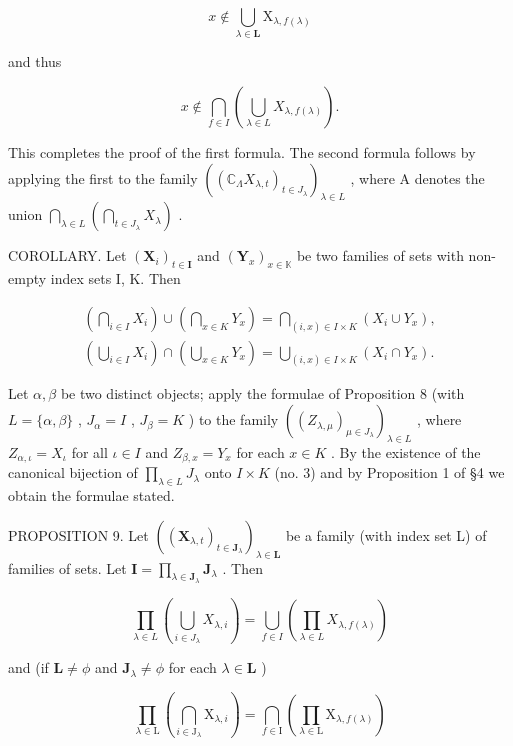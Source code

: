 \[
x \notin \bigcup_ {\lambda \in \mathbf {L}} \mathrm{X} _ {\lambda , f (\lambda)}
\]

and thus

\[
x \notin \bigcap_ {f \in I} \left(\bigcup_ {\lambda \in L} X _ {\lambda , f (\lambda)}\right).
\]

This completes the proof of the first formula. The second formula follows by applying the first to the family \(\left((\mathbb{C}_{\Lambda}X_{\lambda,t})_{t\in J_{\lambda}}\right)_{\lambda \in L}\) , where A denotes the union \(\bigcap_{\lambda \in L}\left(\bigcap_{t\in J_{\lambda}}X_{\lambda}\right)\) .

COROLLARY. Let \((\mathbf{X}_i)_{t\in \mathbf{I}}\) and \((\mathbf{Y}_x)_{x\in \mathbb{K}}\) be two families of sets with non-empty index sets I, K. Then

\[
\begin{array}{l} \left(\bigcap_ {i \in I} X _ {i}\right) \cup \left(\bigcap_ {x \in K} Y _ {x}\right) = \bigcap_ {(i, x) \in I \times K} (X _ {i} \cup Y _ {x}), \\ \left(\bigcup_ {i \in I} X _ {i}\right) \cap \left(\bigcup_ {x \in K} Y _ {x}\right) = \bigcup_ {(i, x) \in I \times K} (X _ {i} \cap Y _ {x}). \end{array}
\]

Let \(\alpha, \beta\) be two distinct objects; apply the formulae of Proposition 8 (with \(L = \{\alpha, \beta\}\) , \(J_{\alpha} = I\) , \(J_{\beta} = K\) ) to the family \(((Z_{\lambda, \mu})_{\mu \in J_{\lambda}})_{\lambda \in L}\) , where \(Z_{\alpha, \iota} = X_{\iota}\) for all \(\iota \in I\) and \(Z_{\beta, x} = Y_{x}\) for each \(x \in K\) . By the existence of the canonical bijection of \(\prod_{\lambda \in L} J_{\lambda}\) onto \(I \times K\) (no. 3) and by Proposition 1 of §4 we obtain the formulae stated.

PROPOSITION 9. Let \(((\mathbf{X}_{\lambda, t})_{t \in \mathbf{J}_{\lambda}})_{\lambda \in \mathbf{L}}\) be a family (with index set L) of families of sets. Let \(\mathbf{I} = \prod_{\lambda \in \mathbf{J}_{\lambda}} \mathbf{J}_{\lambda}\) . Then

\[
\prod_ {\lambda \in L} \left(\bigcup_ {i \in J _ {\lambda}} X _ {\lambda , i}\right) = \bigcup_ {f \in I} \left(\prod_ {\lambda \in L} X _ {\lambda , f (\lambda)}\right)
\]

and (if \(\mathbf{L} \neq \phi\) and \(\mathbf{J}_{\lambda} \neq \phi\) for each \(\lambda \in \mathbf{L}\) )

\[
\prod_ {\lambda \in \mathrm{L}} \left(\bigcap_ {i \in \mathrm{J} _ {\lambda}} \mathrm{X} _ {\lambda , i}\right) = \bigcap_ {f \in \mathrm{I}} \left(\prod_ {\lambda \in \mathrm{L}} \mathrm{X} _ {\lambda , f (\lambda)}\right)
\]

